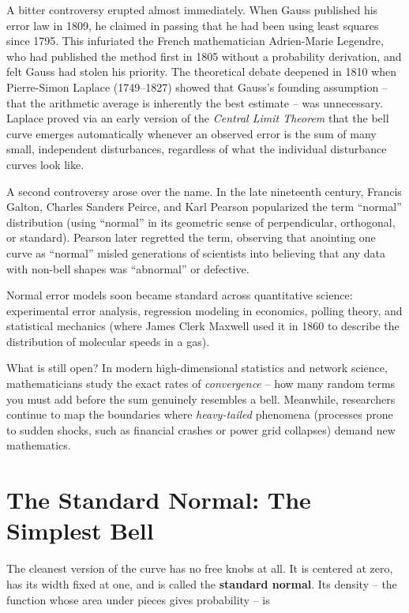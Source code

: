 \begin{historybox}
A bitter controversy erupted almost immediately. When Gauss published his error
law in 1809, he claimed in passing that he had been using least squares since
1795. This infuriated the French mathematician Adrien-Marie Legendre, who had
published the method first in 1805 without a probability derivation, and felt
Gauss had stolen his priority. The theoretical debate deepened in 1810 when
Pierre-Simon Laplace (1749--1827) showed that Gauss's founding assumption -- that
the arithmetic average is inherently the best estimate -- was unnecessary. Laplace proved via an early version of the \emph{Central Limit
Theorem} that the bell curve emerges automatically whenever an observed error is
the sum of many small, independent disturbances, regardless of what the
individual disturbance curves look like.

A second controversy arose over the name. In the late nineteenth century, Francis
Galton, Charles Sanders Peirce, and Karl Pearson popularized the term ``normal''
distribution (using ``normal'' in its geometric sense of perpendicular,
orthogonal, or standard). Pearson later regretted the term, observing that
anointing one curve as ``normal'' misled generations of scientists into believing
that any data with non-bell shapes was ``abnormal'' or defective.

Normal error models soon became standard across quantitative science:
experimental error analysis, regression modeling in economics,
polling theory, and statistical mechanics (where James Clerk Maxwell used it in
1860 to describe the distribution of molecular speeds in a gas).

What is still open? In modern high-dimensional statistics and network science,
mathematicians study the exact rates of \emph{convergence} -- how many
random terms you must add before the sum genuinely resembles a bell.
Meanwhile, researchers continue to map the boundaries where \emph{heavy-tailed} phenomena
(processes prone to sudden shocks, such as financial crashes or
power grid collapses) demand new mathematics.
\end{historybox}

\section{The Standard Normal: The Simplest Bell}
\label{ch12:standard}

The cleanest version of the curve has no free knobs at all. It is centered at
zero, has its width fixed at one, and is called the \textbf{standard normal}. Its
density -- the function whose area under pieces gives probability -- is

